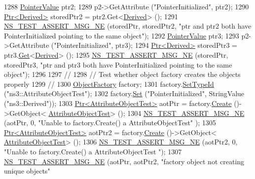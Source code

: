 \begin{DoxyCode}
1288   \hyperlink{classns3_1_1PointerValue}{PointerValue} ptr2;
1289   p2->GetAttribute (\textcolor{stringliteral}{"PointerInitialized"}, ptr2);
1290   \hyperlink{classns3_1_1Ptr}{Ptr<Derived>} storedPtr2 = ptr2.Get<\hyperlink{classDerived}{Derived}> ();
1291   \hyperlink{group__testing_ga73d66fb0050a5111453fd144e767b91a}{NS\_TEST\_ASSERT\_MSG\_NE} (storedPtr, storedPtr2, \textcolor{stringliteral}{"ptr and ptr2 both have
       PointerInitialized pointing to the same object"});
1292   \hyperlink{classns3_1_1PointerValue}{PointerValue} ptr3;
1293   p2->GetAttribute (\textcolor{stringliteral}{"PointerInitialized"}, ptr3);
1294   \hyperlink{classns3_1_1Ptr}{Ptr<Derived>} storedPtr3 = ptr3.\hyperlink{classns3_1_1PointerValue_ae8e90fe3c0810cd6e4e1b1ba31f52a66}{Get}<\hyperlink{classDerived}{Derived}> ();
1295   \hyperlink{group__testing_ga73d66fb0050a5111453fd144e767b91a}{NS\_TEST\_ASSERT\_MSG\_NE} (storedPtr, storedPtr3, \textcolor{stringliteral}{"ptr and ptr3 both have
       PointerInitialized pointing to the same object"});
1296 
1297   \textcolor{comment}{// }
1298   \textcolor{comment}{// Test whether object factory creates the objects properly}
1299   \textcolor{comment}{//}
1300   \hyperlink{classns3_1_1ObjectFactory}{ObjectFactory} factory;
1301   factory.\hyperlink{classns3_1_1ObjectFactory_a77dcd099064038a1eb7a6b8251229ec3}{SetTypeId} (\textcolor{stringliteral}{"ns3::AttributeObjectTest"});
1302   factory.\hyperlink{classns3_1_1ObjectFactory_aef5c0d5019c96bdf01cefd1ff83f4a68}{Set} (\textcolor{stringliteral}{"PointerInitialized"}, StringValue (\textcolor{stringliteral}{"ns3::Derived"}));
1303   \hyperlink{classns3_1_1Ptr}{Ptr<AttributeObjectTest>} aotPtr = factory.\hyperlink{classns3_1_1ObjectFactory_a18152e93f0a6fe184ed7300cb31e9896}{Create} ()->GetObject<
      \hyperlink{classAttributeObjectTest}{AttributeObjectTest}> ();
1304   \hyperlink{group__testing_ga73d66fb0050a5111453fd144e767b91a}{NS\_TEST\_ASSERT\_MSG\_NE} (aotPtr, 0, \textcolor{stringliteral}{"Unable to factory.Create() a AttributeObjectTest"}
      );
1305   \hyperlink{classns3_1_1Ptr}{Ptr<AttributeObjectTest>} aotPtr2 = factory.\hyperlink{classns3_1_1ObjectFactory_a18152e93f0a6fe184ed7300cb31e9896}{Create} ()->GetObject<
      \hyperlink{classAttributeObjectTest}{AttributeObjectTest}> ();
1306   \hyperlink{group__testing_ga73d66fb0050a5111453fd144e767b91a}{NS\_TEST\_ASSERT\_MSG\_NE} (aotPtr2, 0, \textcolor{stringliteral}{"Unable to factory.Create() a AttributeObjectTest
      "});
1307   \hyperlink{group__testing_ga73d66fb0050a5111453fd144e767b91a}{NS\_TEST\_ASSERT\_MSG\_NE} (aotPtr, aotPtr2, \textcolor{stringliteral}{"factory object not creating unique objects"}

\end{DoxyCode}
